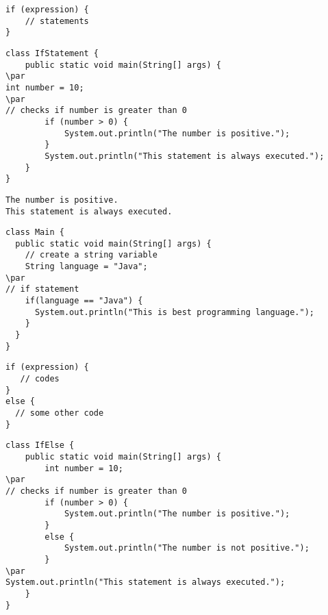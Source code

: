\documentclass{book}
\def\lthtmlcheckvsize{\ifdim\ht\sizebox<\vsize 
  \ifdim\wd\sizebox<\hsize\expandafter\hfill\fi \expandafter\vfill
  \else\expandafter\vss\fi}%
\begin{document}
{\newpage\clearpage
{}%
\begin{lstlisting}
if (expression) {
    // statements
}
\end{lstlisting}%
\lthtmlfigureZ
\lthtmlcheckvsize\clearpage}

{\newpage\clearpage
{}%
\begin{lstlisting}
class IfStatement {
    public static void main(String[] args) {
\par
int number = 10;
\par
// checks if number is greater than 0
        if (number > 0) {
            System.out.println("The number is positive.");
        }
        System.out.println("This statement is always executed.");
    }
}
\end{lstlisting}%
\lthtmlfigureZ
\lthtmlcheckvsize\clearpage}

{\newpage\clearpage
{}%
\begin{lstlisting}
The number is positive.
This statement is always executed.
\end{lstlisting}%
\lthtmlfigureZ
\lthtmlcheckvsize\clearpage}

{\newpage\clearpage
{}%
\begin{lstlisting}
class Main {
  public static void main(String[] args) {
    // create a string variable
    String language = "Java";
\par
// if statement
    if(language == "Java") {
      System.out.println("This is best programming language.");
    } 
  }
}
\end{lstlisting}%
\lthtmlfigureZ
\lthtmlcheckvsize\clearpage}

{\newpage\clearpage
{}%
\begin{lstlisting}
if (expression) {
   // codes
}
else {
  // some other code
}
\end{lstlisting}%
\lthtmlfigureZ
\lthtmlcheckvsize\clearpage}

{\newpage\clearpage
{}%
\begin{lstlisting}
class IfElse {
    public static void main(String[] args) {    	
        int number = 10;
\par
// checks if number is greater than 0	 
        if (number > 0) {
            System.out.println("The number is positive.");
        }
        else {
            System.out.println("The number is not positive.");
        }
\par
System.out.println("This statement is always executed.");
    }
}
\end{lstlisting}%
\lthtmlfigureZ
\lthtmlcheckvsize\clearpage}
\end{document}
